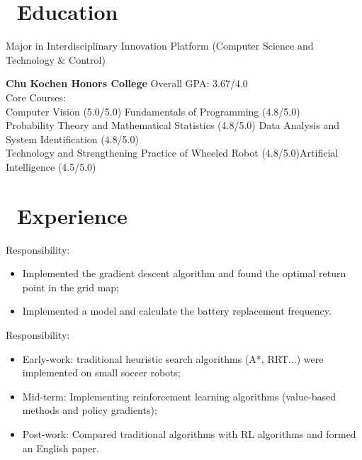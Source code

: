 \documentclass{resume}
\begin{document}



\section{\faGraduationCap\ Education}
Major in Interdisciplinary Innovation Platform (Computer Science and Technology \& Control) 

\textbf{Chu Kochen Honors College} \hfill Overall GPA: 3.67/4.0\\
Core Courses:\\
Computer Vision (5.0/5.0) \hfill Fundamentals of Programming (4.8/5.0)\\
Probability Theory and Mathematical Statistics (4.8/5.0) \hfill Data Analysis and System Identification (4.8/5.0)\\
Technology and Strengthening Practice of Wheeled Robot (4.8/5.0)\hfill Artificial Intelligence (4.5/5.0)

\section{\faUsers\ Experience}
Responsibility: 
\begin{itemize}
  \item Implemented the gradient descent algorithm and found the optimal return point in the grid map;
  \item Implemented a model and calculate the battery replacement frequency.
\end{itemize}

Responsibility: 
\begin{itemize}
  \item Early-work: traditional heuristic search algorithms (A*, RRT...) were implemented on small soccer robots;
  \item Mid-term: Implementing reinforcement learning algorithms (value-based methods and policy gradients);
  \item Post-work: Compared traditional algorithms with RL algorithms and formed an English paper.
\end{itemize}
\end{document}
